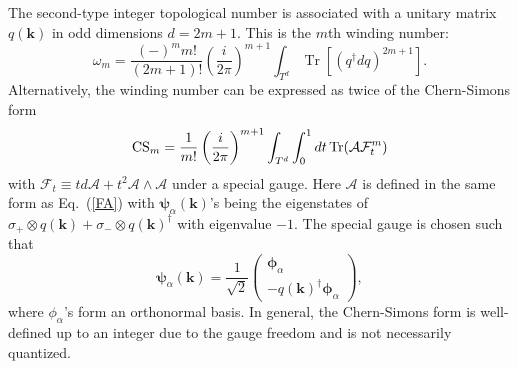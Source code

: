 \documentclass[prl,twocolumn,preprintnumbers,superscriptaddress,amsmath,amssymb]{revtex4-1}
\newcommand{\Tr}{\operatorname{Tr}}
\begin{document}
The second-type integer topological number is associated with a unitary matrix $q(\boldsymbol{k})$ in odd dimensions $d=2m+1$. This is the $m$th winding number: 
\begin{equation}
\omega_m = \frac{(-)^m m!}{(2m+1)!} \left(\frac{i}{2\pi}\right)^{m+1} \int_{T^d} \Tr[(q^\dag dq)^{2m+1}]. 
\label{wd}
\end{equation}
Alternatively, the winding number can be expressed as twice of the Chern-Simons form
\begin{equation}
{\rm CS}_m = \frac{1}{m!} \left(\frac{i}{2\pi}\right)^{m+1} \int_{T^d} \int^1_0 dt \Tr (\mathcal{A}\mathcal{F}^m_t)
\label{CS}
\end{equation}
with $\mathcal{F}_t \equiv t d\mathcal{A} + t^2 \mathcal{A}\wedge\mathcal{A}$ under a special gauge. Here $\mathcal{A}$ is defined in the same form as Eq.~(\ref{FA}) with $\boldsymbol{\psi}_\alpha(\boldsymbol{k})$'s being the eigenstates of $\sigma_+\otimes q(\boldsymbol{k}) + \sigma_-\otimes q(\boldsymbol{k})^\dag$ with eigenvalue $-1$. The special gauge is chosen such that 
\begin{equation}
\boldsymbol{\psi}_\alpha(\boldsymbol{k})= \frac{1}{\sqrt{2}} \begin{pmatrix}\boldsymbol{\phi}_\alpha \\ -q(\boldsymbol{k})^\dag\boldsymbol{\phi}_\alpha\end{pmatrix}, 
\label{spg}
\end{equation}
where $\phi_\alpha$'s form an orthonormal basis. In general, the Chern-Simons form is well-defined up to an integer due to the gauge freedom and is not necessarily quantized. 
\end{document}
